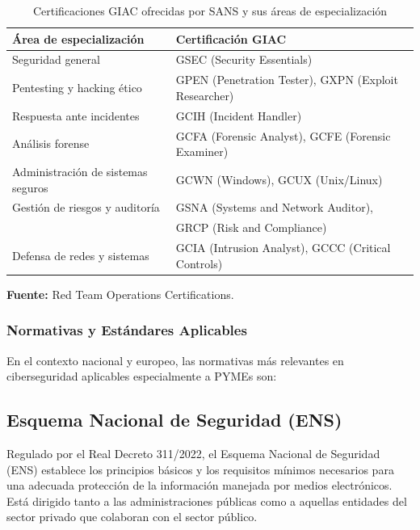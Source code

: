 \documentclass[a4paper, 11pt]{article}
\begin{document}
\begin{table}[H]
\centering
\caption{Certificaciones GIAC ofrecidas por SANS y sus áreas de especialización}
\begin{tabular}{|l|l|}
\hline
\textbf{Área de especialización} & \textbf{Certificación GIAC} \\
\hline
Seguridad general & GSEC (Security Essentials) \\
Pentesting y hacking ético & GPEN (Penetration Tester), GXPN (Exploit Researcher) \\
Respuesta ante incidentes & GCIH (Incident Handler) \\
Análisis forense & GCFA (Forensic Analyst), GCFE (Forensic Examiner) \\
Administración de sistemas seguros & GCWN (Windows), GCUX (Unix/Linux) \\
Gestión de riesgos y auditoría & GSNA (Systems and Network Auditor), \\
&GRCP (Risk and Compliance)\\
Defensa de redes y sistemas & GCIA (Intrusion Analyst), GCCC (Critical Controls) \\
\hline
\end{tabular}
\begin{flushleft}
\footnotesize \textbf{Fuente:} Red Team Operations Certifications. \cite{sanscert}

\end{flushleft}
\label{tab:giac-certificaciones}
\end{table}

\subsubsection{Normativas y Estándares Aplicables}
\par\vspace{0.5cm}

En el contexto nacional y europeo, las normativas más relevantes en ciberseguridad aplicables especialmente a PYMEs son:
\par\vspace{0.5cm}

\subsection*{Esquema Nacional de Seguridad (ENS)}

Regulado por el Real Decreto 311/2022, el Esquema Nacional de Seguridad (ENS) establece los principios básicos y los requisitos mínimos necesarios para una adecuada protección de la información manejada por medios electrónicos. Está dirigido tanto a las administraciones públicas como a aquellas entidades del sector privado que colaboran con el sector público.
\par\vspace{0.5cm}
\end{document}
